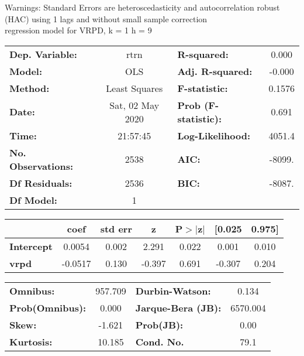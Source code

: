 Warnings: \newline
 [1] Standard Errors are heteroscedasticity and autocorrelation robust (HAC) using 1 lags and without small sample correction\\ 

regression model for VRPD, k = 1 h = 9\begin{center}
\begin{tabular}{lclc}
\toprule
\textbf{Dep. Variable:}    &       rtrn       & \textbf{  R-squared:         } &     0.000   \\
\textbf{Model:}            &       OLS        & \textbf{  Adj. R-squared:    } &    -0.000   \\
\textbf{Method:}           &  Least Squares   & \textbf{  F-statistic:       } &    0.1576   \\
\textbf{Date:}             & Sat, 02 May 2020 & \textbf{  Prob (F-statistic):} &    0.691    \\
\textbf{Time:}             &     21:57:45     & \textbf{  Log-Likelihood:    } &    4051.4   \\
\textbf{No. Observations:} &        2538      & \textbf{  AIC:               } &    -8099.   \\
\textbf{Df Residuals:}     &        2536      & \textbf{  BIC:               } &    -8087.   \\
\textbf{Df Model:}         &           1      & \textbf{                     } &             \\
\bottomrule
\end{tabular}
\begin{tabular}{lcccccc}
                   & \textbf{coef} & \textbf{std err} & \textbf{z} & \textbf{P$> |$z$|$} & \textbf{[0.025} & \textbf{0.975]}  \\
\midrule
\textbf{Intercept} &       0.0054  &        0.002     &     2.291  &         0.022        &        0.001    &        0.010     \\
\textbf{vrpd}      &      -0.0517  &        0.130     &    -0.397  &         0.691        &       -0.307    &        0.204     \\
\bottomrule
\end{tabular}
\begin{tabular}{lclc}
\textbf{Omnibus:}       & 957.709 & \textbf{  Durbin-Watson:     } &    0.134  \\
\textbf{Prob(Omnibus):} &   0.000 & \textbf{  Jarque-Bera (JB):  } & 6570.004  \\
\textbf{Skew:}          &  -1.621 & \textbf{  Prob(JB):          } &     0.00  \\
\textbf{Kurtosis:}      &  10.185 & \textbf{  Cond. No.          } &     79.1  \\
\bottomrule
\end{tabular}
\end{center}

